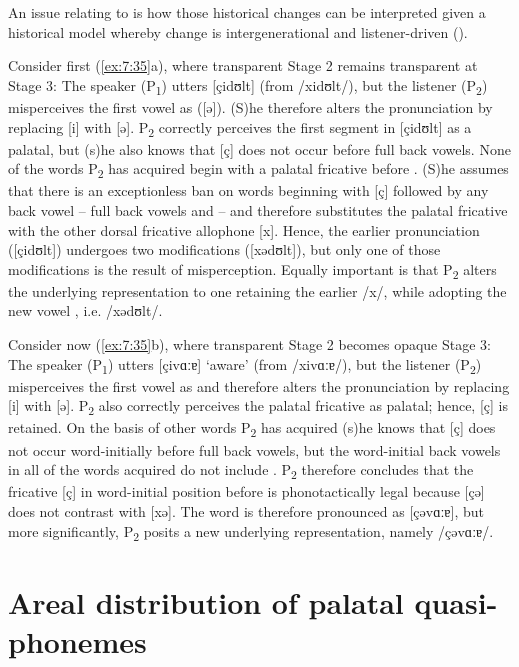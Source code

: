 An issue relating to  is how those historical changes can be interpreted given a historical model whereby change is intergenerational and listener-driven ().

Consider first (\ref{ex:7:35}a), where transparent Stage 2 remains transparent at Stage 3: The speaker (P\textsubscript{1}) utters [çidʊlt] (from /xidʊlt/), but the listener (P\textsubscript{2}) misperceives the first vowel as  ([ə]). (S)he therefore alters the pronunciation by replacing [i] with [ə]. P\textsubscript{2} correctly perceives the first segment in [çidʊlt] as a palatal, but (s)he also knows that [ç] does not occur before full back vowels. None of the words P\textsubscript{2}  has acquired begin with a palatal fricative before . (S)he assumes that there is an exceptionless ban on words beginning with [ç] followed by any back vowel -- full back vowels and  -- and therefore substitutes the palatal fricative with the other dorsal fricative allophone [x]. Hence, the earlier pronunciation ([çidʊlt]) undergoes two modifications ([xədʊlt]), but only one of those modifications is the result of misperception. Equally important is that P\textsubscript{2} alters the underlying representation to one retaining the earlier /x/, while adopting the new vowel , i.e. /xədʊlt/.

Consider now (\ref{ex:7:35}b), where transparent Stage 2 becomes opaque Stage 3: The speaker (P\textsubscript{1}) utters [çivɑːɐ] ‘aware’ (from /xivɑːɐ/), but the listener (P\textsubscript{2}) misperceives the first vowel as  and therefore alters the pronunciation by replacing [i] with [ə]. P\textsubscript{2} also correctly perceives the palatal fricative as palatal; hence, [ç] is retained. On the basis of other words P\textsubscript{2} has acquired (s)he knows that [ç] does not occur word-initially before full back vowels, but the word-initial back vowels in all of the words acquired do not include . P\textsubscript{2} therefore concludes that the fricative [ç] in word-initial position before  is phonotactically legal because [çə] does not contrast with [xə]. The word is therefore pronounced as [çəvɑːɐ], but more significantly, P\textsubscript{2} posits a new underlying representation, namely /çəvɑːɐ/.

\section{Areal distribution of palatal quasi-phonemes}\label{sec:7.5}

